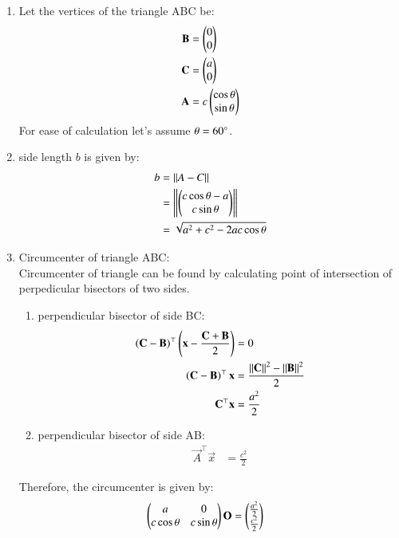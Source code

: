 \documentclass[journal,12pt,twocolumn]{IEEEtran}
\begin{document}
\begin{enumerate}

\item Let the vertices of the triangle ABC be:
	\begin{align}
		\mathbf{B} &= \begin{pmatrix}0\\0\end{pmatrix}\\
		\mathbf{C} &= \begin{pmatrix}a\\0\end{pmatrix}\\
		\mathbf{A} &= c\begin{pmatrix}\cos{\theta}\\ \sin{\theta}\end{pmatrix}
	\end{align}
	For ease of calculation let's assume $\theta = 60{\degree}$.

\item side length $b$ is given by:
	\begin{align}
		b &= \left\lVert A-C\right\rVert\\
		&= \left\lVert \begin{pmatrix} c\cos{\theta} - a \\ c\sin{\theta}\end{pmatrix}\right\rVert \\
		&= \sqrt{a^2 + c^2 - 2ac \cos{\theta}}\\
	\end{align}

\item Circumcenter of triangle ABC:\\
	Circumcenter of triangle can be found by calculating point of intersection of perpedicular bisectors of two sides.
	\begin{enumerate}
	\item perpendicular bisector of side BC:
		\begin{align}
			\left(\mathbf{C}-\mathbf{B}\right)^{\top}\left(\mathbf{x}- \frac{\mathbf{C}+\mathbf{B}}{2}\right) &= 0\\
			\left(\mathbf{C}-\mathbf{B}\right)^{\top} \mathbf{x} &= \frac{\left\lVert\mathbf{C}\right\rVert^2 -\left\lVert\mathbf{B}\right\rVert^2}{2}\\
			\mathbf{C}^{\top}\mathbf{x} &= \frac{a^2}{2} 
		\end{align}
	\item perpendicular bisector of side AB:
		\begin{align}
			\vec{A}^{\top}\vec{x} &= \frac{c^2}{2}
		\end{align}
	\end{enumerate}
	
	Therefore, the circumcenter is given by:
		\begin{align}
			\begin{pmatrix} a & 0\\ c \cos{\theta} & c \sin{\theta}\end{pmatrix} \mathbf{O} &= \begin{pmatrix} \frac{a^2}{2} \\ \frac{c^2}{2}\end{pmatrix}
		\end{align}


\end{enumerate}
\end{document}

